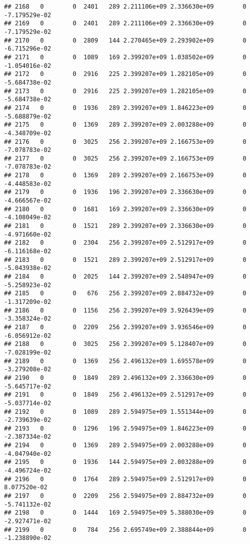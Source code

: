 \documentclass[
]{article}
\begin{document}
\begin{enumerate}
\begin{verbatim}
## 2168   0        0  2401   289 2.211106e+09 2.336630e+09        0 -7.179529e-02
## 2169   0        0  2401   289 2.211106e+09 2.336630e+09        0 -7.179529e-02
## 2170   0        0  2809   144 2.270465e+09 2.293902e+09        0 -6.715296e-02
## 2171   0        0  1089   169 2.399207e+09 1.038502e+09        0 -1.054016e-02
## 2172   0        0  2916   225 2.399207e+09 1.282105e+09        0 -5.684738e-02
## 2173   0        0  2916   225 2.399207e+09 1.282105e+09        0 -5.684738e-02
## 2174   0        0  1936   289 2.399207e+09 1.846223e+09        0 -5.688879e-02
## 2175   0        0  1369   289 2.399207e+09 2.003288e+09        0 -4.348709e-02
## 2176   0        0  3025   256 2.399207e+09 2.166753e+09        0 -7.078783e-02
## 2177   0        0  3025   256 2.399207e+09 2.166753e+09        0 -7.078783e-02
## 2178   0        0  1369   289 2.399207e+09 2.166753e+09        0 -4.448583e-02
## 2179   0        0  1936   196 2.399207e+09 2.336630e+09        0 -4.666567e-02
## 2180   0        0  1681   169 2.399207e+09 2.336630e+09        0 -4.108049e-02
## 2181   0        0  1521   289 2.399207e+09 2.336630e+09        0 -4.971660e-02
## 2182   0        0  2304   256 2.399207e+09 2.512917e+09        0 -6.116168e-02
## 2183   0        0  1521   289 2.399207e+09 2.512917e+09        0 -5.043938e-02
## 2184   0        0  2025   144 2.399207e+09 2.548947e+09        0 -5.258923e-02
## 2185   0        0   676   256 2.399207e+09 2.884732e+09        0 -1.317209e-02
## 2186   0        0  1156   256 2.399207e+09 3.926439e+09        0 -3.358324e-02
## 2187   0        0  2209   256 2.399207e+09 3.936546e+09        0 -6.056912e-02
## 2188   0        0  3025   256 2.399207e+09 5.128407e+09        0 -7.028199e-02
## 2189   0        0  1369   256 2.496132e+09 1.695578e+09        0 -3.279208e-02
## 2190   0        0  1849   289 2.496132e+09 2.336630e+09        0 -5.645717e-02
## 2191   0        0  1849   256 2.496132e+09 2.512917e+09        0 -5.037714e-02
## 2192   0        0  1089   289 2.594975e+09 1.551344e+09        0 -2.739639e-02
## 2193   0        0  1296   196 2.594975e+09 1.846223e+09        0 -2.387334e-02
## 2194   0        0  1369   289 2.594975e+09 2.003288e+09        0 -4.047940e-02
## 2195   0        0  1936   144 2.594975e+09 2.003288e+09        0 -4.496724e-02
## 2196   0        0  1764   289 2.594975e+09 2.512917e+09        0  8.077520e-02
## 2197   0        0  2209   256 2.594975e+09 2.884732e+09        0 -5.741132e-02
## 2198   0        0  1444   169 2.594975e+09 5.388030e+09        0 -2.927471e-02
## 2199   0        0   784   256 2.695749e+09 2.388844e+09        0 -1.238890e-02

\end{verbatim}
\end{enumerate}
\end{document}
